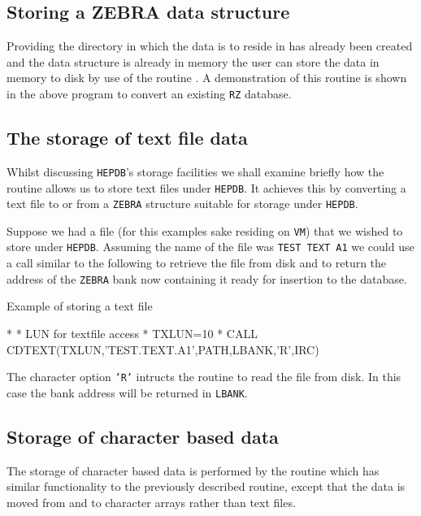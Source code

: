 \subsection{Storing a ZEBRA data structure}
Providing the directory in which the data is to reside in has already been
created and the data structure is already in memory the user can
store the data in memory to disk by use of the routine .
A demonstration of this routine is shown in the above program to convert
an existing {\tt RZ} database.
%
%
%
%
\subsection{The storage of text file data}
Whilst discussing {\tt HEPDB}'s storage facilities we shall examine briefly
how the routine  allows us to store text files under {\tt HEPDB}.
It achieves this by converting a text file to or from a {\tt ZEBRA} structure
suitable for storage under {\tt HEPDB}.
\par
Suppose we had a file (for this examples sake residing on {\tt VM}) that we
wished to store under {\tt HEPDB}. Assuming the name of the file was
{\tt TEST TEXT A1} we could use a call similar to the following
to retrieve the file from disk and to return the address of the {\tt ZEBRA}
bank now containing it ready for insertion to the database.
%
\begin{XMPt}{Example of storing a text file}

*
*     LUN for textfile access
*
      TXLUN=10
*
      CALL CDTEXT(TXLUN,'TEST.TEXT.A1',PATH,LBANK,'R',IRC)

\end{XMPt}
The character option {\tt 'R'} intructs the  routine to read
the file from disk. In this case the bank address will be returned in {\tt LBANK}.
%
%
%
\subsection{Storage of character based data}
The storage of character based data is performed by the routine 
which has similar functionality to the previously described 
routine, except that the data is moved from and to character
arrays rather than text files.
%
%
%
